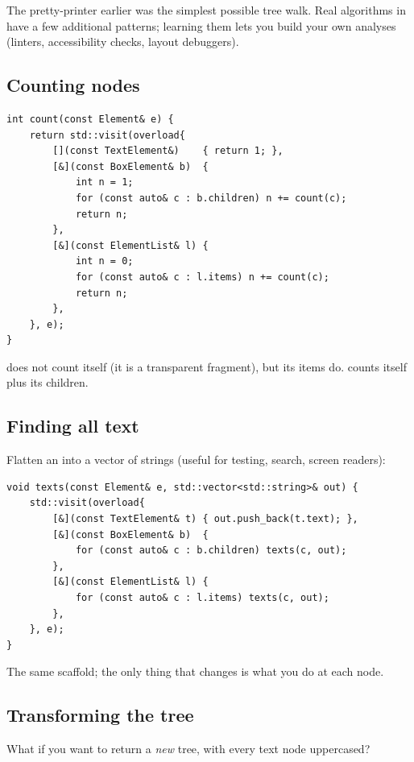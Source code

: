 The pretty-printer earlier was the simplest possible tree walk. Real
algorithms in \maya{} have a few additional patterns; learning them
lets you build your own analyses (linters, accessibility checks,
layout debuggers).

\subsection{Counting nodes}

\begin{lstlisting}
int count(const Element& e) {
    return std::visit(overload{
        [](const TextElement&)    { return 1; },
        [&](const BoxElement& b)  {
            int n = 1;
            for (const auto& c : b.children) n += count(c);
            return n;
        },
        [&](const ElementList& l) {
            int n = 0;
            for (const auto& c : l.items) n += count(c);
            return n;
        },
    }, e);
}
\end{lstlisting}

 does not count itself (it is a transparent
fragment), but its items do.  counts itself plus
its children.

\subsection{Finding all text}

Flatten an  into a vector of strings (useful for
testing, search, screen readers):

\begin{lstlisting}
void texts(const Element& e, std::vector<std::string>& out) {
    std::visit(overload{
        [&](const TextElement& t) { out.push_back(t.text); },
        [&](const BoxElement& b)  {
            for (const auto& c : b.children) texts(c, out);
        },
        [&](const ElementList& l) {
            for (const auto& c : l.items) texts(c, out);
        },
    }, e);
}
\end{lstlisting}

The same scaffold; the only thing that changes is what you do at
each node.

\subsection{Transforming the tree}

What if you want to return a \emph{new} tree, with every text node
uppercased?

